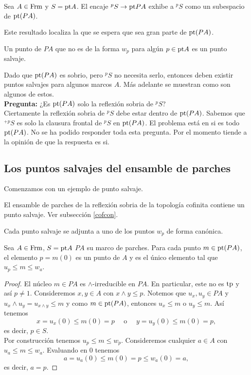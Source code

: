 \begin{thm}\label{Teorema9.3.3}
    Sea $A\in \mathrm{Frm}$ y $S=\mathrm{pt} A$. El encaje $^pS\to \mathrm{pt} PA$ exhibe a $^pS$ como un subespacio de $\mathrm{pt} (PA)$.
\end{thm}

Este resultado localiza la que se espera que sea gran parte de $\mathrm{pt} (PA)$.

\begin{dfn}\label{Definicion9.3.4}
    Un punto de $PA$ que no es de la forma $w_p$ para algún $p\in \mathrm{pt} A$ es un punto salvaje.
\end{dfn}

Dado que $\mathrm{pt}(PA)$ es sobrio, pero $^pS$ no necesita serlo, entonces deben existir puntos salvajes para algunos marcos $A$. Más adelante se muestran como son algunos de estos.\\

\textbf{Pregunta:} ¿Es $\mathrm{pt}(PA)$ solo la reflexión sobria de $^pS$?\\

Ciertamente la reflexión sobria de $^pS$ debe estar dentro de $\mathrm{pt}(PA)$. Sabemos que $^{+p}S$ es solo la clausura frontal de $^pS$ en $\mathrm{pt}(PA)$. El problema está en si es todo $\mathrm{pt}(PA)$. No se ha podido responder toda esta pregunta. Por el momento tiende a la opinión de que la respuesta es si.

\subsection{Los puntos salvajes del ensamble de parches}

Comenzamos con un ejemplo de punto salvaje.

\begin{ej}\label{Ejemplo9.4.1}
    El ensamble de parches de la reflexión sobria de la topología cofinita contiene un punto salvaje. Ver subsección \ref{cofcon}.
\end{ej}

Cada punto salvaje se adjunta a uno de los puntos $w_p$ de forma canónica.

\begin{lem}\label{Lema9.4.2}
    Sea $A\in \mathrm{Frm}$, $S=\mathrm{pt} A$ $PA$ su marco de parches. Para cada punto $m\in \mathrm{pt}(PA)$, el elemento $p=m(0)$ es un punto de $A$ y es el único elemento tal que $u_p\leq m\leq w_a$.
\end{lem}

\begin{proof}
    El núcleo $m\in PA$ es $\wedge$-irreducible en $PA$. En particular, este no es $\mathrm{tp}$ y así $p\neq 1$. Consideremos $x, y\in A$ con $x\wedge y\leq p$. Notemos que $u_x, u_y\in PA$ y $u_x\wedge u_y=u_{x\wedge y}\leq m$ y como $m\in \mathrm{pt}(PA)$, entonces $u_x\leq m$ o $u_y\leq m$. Así tenemos 
    \[
    x=u_x(0)\leq m(0)=p\quad\mbox{ o }\quad y=u_y(0)\leq m(0)=p,
    \]
    es decir, $p\in S$.\\

    Por construcción tenemos $u_p\leq m\leq w_p$. Consideremos cualquier $a\in A$ con $u_a\leq m\leq w_a$. Evaluando en $0$ tenemos
    \[
    a=u_a(0)\leq m(0)=p\leq w_a(0)=a,
    \]
    es decir, $a=p$.
\end{proof}


